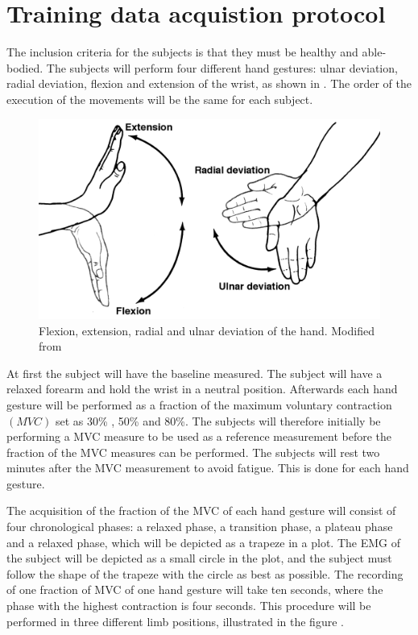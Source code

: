 \section{Training data acquistion protocol}

The inclusion criteria for the subjects is that they must be healthy and able-bodied. The subjects will perform four different hand gestures: ulnar deviation, radial deviation, flexion and extension of the wrist, as shown in . The order of the execution of the movements will be the same for each subject.

\begin{figure}[H]
	\includegraphics[width=.5\textwidth]{figures/Anatomy/wrist_move}  %
	\caption{Flexion, extension, radial and ulnar deviation of the hand. Modified from  \cite{hamilton2008}}
	\label{fig:handgest}  %
\end{figure}

At first the subject will have the baseline measured. The subject will have a relaxed forearm and hold the wrist in a neutral position. Afterwards each hand gesture will be performed as a fraction of the maximum voluntary contraction $\left( MVC\right)$ set as 30\% , 50\% and 80\%. The subjects will therefore initially be performing a MVC measure to be used as a reference measurement before the fraction of the MVC measures can be performed. The subjects will rest two minutes after the MVC measurement to avoid fatigue. This is done for each hand gesture. 

The acquisition of the fraction of the MVC of each hand gesture will consist of four chronological phases: a relaxed phase, a transition phase, a plateau phase and a relaxed phase, which will be depicted as a trapeze in a plot. The EMG of the subject will be depicted as a small circle in the plot, and the subject must follow the shape of the trapeze with the circle as best as possible. The recording of one fraction of MVC of one hand gesture will take ten seconds, where the phase with the highest contraction is four seconds. 
This procedure will be performed in three different limb positions, illustrated in the figure .

